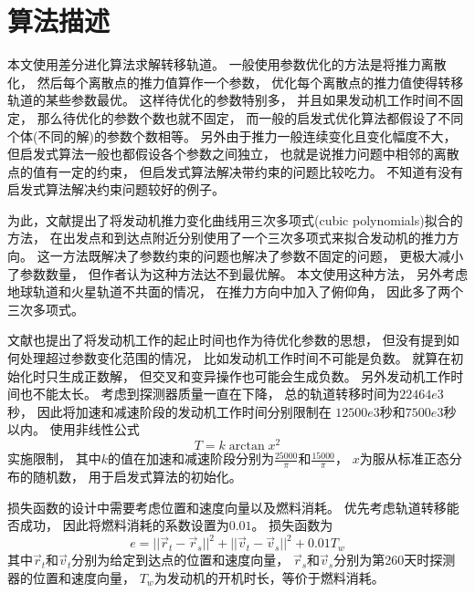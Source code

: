 \section{算法描述}
本文使用差分进化算法\cite{jqingfeng2017}求解转移轨道。
一般使用参数优化的方法是将推力离散化，
然后每个离散点的推力值算作一个参数，
优化每个离散点的推力值使得转移轨道的某些参数最优。
这样待优化的参数特别多\cite{dchengxing2011}，
并且如果发动机工作时间不固定，
那么待优化的参数个数也就不固定，
而一般的启发式优化算法都假设了不同个体(不同的解)的参数个数相等。
另外由于推力一般连续变化且变化幅度不大，
但启发式算法一般也都假设各个参数之间独立，
也就是说推力问题中相邻的离散点的值有一定的约束，
但启发式算法解决带约束的问题比较吃力。
不知道有没有启发式算法解决约束问题较好的例子。

为此，文献\cite{jbradley2005}提出了将发动机推力变化曲线用三次多项式(cubic polynomials)拟合的方法，
在出发点和到达点附近分别使用了一个三次多项式来拟合发动机的推力方向。
这一方法既解决了参数约束的问题也解决了参数不固定的问题，
更极大减小了参数数量，
但作者认为这种方法达不到最优解。
本文使用这种方法，
另外考虑地球轨道和火星轨道不共面的情况，
在推力方向中加入了俯仰角，
因此多了两个三次多项式。

文献\cite{jbradley2005}也提出了将发动机工作的起止时间也作为待优化参数的思想，
但没有提到如何处理超过参数变化范围的情况，
比如发动机工作时间不可能是负数。
就算在初始化时只生成正数解，
但交叉和变异操作也可能会生成负数。
另外发动机工作时间也不能太长。
考虑到探测器质量一直在下降，
总的轨道转移时间为$22464e3$秒，
因此将加速和减速阶段的发动机工作时间分别限制在
$12500e3$秒和$7500e3$秒以内。
使用非线性公式
\[T=k\arctan{x}^2\]
实施限制，
其中$k$的值在加速和减速阶段分别为$\frac{25000}{\pi}$和$\frac{15000}{\pi}$，
$x$为服从标准正态分布的随机数，
用于启发式算法的初始化。

损失函数的设计中需要考虑位置和速度向量以及燃料消耗。
优先考虑轨道转移能否成功，
因此将燃料消耗的系数设置为$0.01$。
损失函数为
\begin{equation*}
    e = ||\vec{r}_t-\vec{r}_s||^2
    + ||\vec{v}_t-\vec{v}_s||^2
    + 0.01T_w
\end{equation*}
其中$\vec{r}_t$和$\vec{v}_t$分别为给定到达点的位置和速度向量，
$\vec{r}_s$和$\vec{v}_s$分别为第260天时探测器的位置和速度向量，
$T_w$为发动机的开机时长，等价于燃料消耗。

